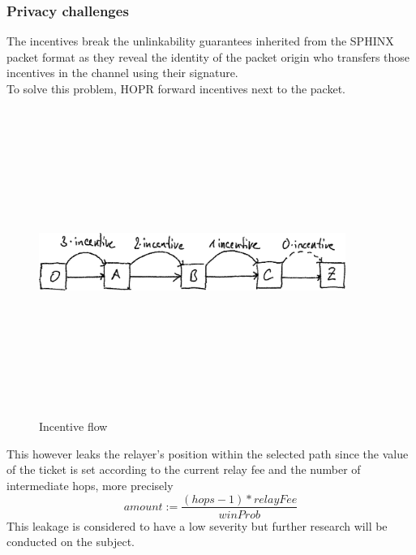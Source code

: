 \subsubsection*{Privacy challenges}
The incentives break the unlinkability guarantees inherited from the SPHINX packet format as they reveal the identity of the packet origin who transfers those incentives in the channel using their signature. 
\\To solve this problem, HOPR forward incentives next to the packet.
\begin{figure}[H]
    \centering
    \includegraphics[width=10cm,height=10cm,keepaspectratio]{../whitepaper/images/token_cashflow.png}
    \caption{Incentive flow}
    \label{fig:Incentive flow}
    \end{figure}

    \hspace{-5mm}This however leaks the relayer’s position within the selected path since the value of the ticket is set according to the current relay fee and the number of intermediate hops, 
more precisely $$amount:=\frac{(hops -1)* relayFee}{winProb}$$
This leakage is considered to have a low severity but further research will be conducted on the subject.







